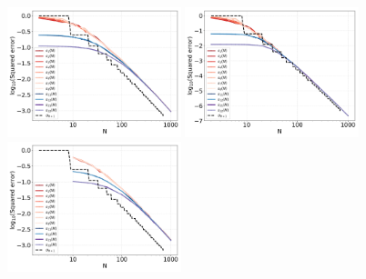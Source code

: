 \documentclass[twoside,11pt]{book}
\numberwithin{theorem}{chapter}
\numberwithin{definition}{chapter}
\numberwithin{proposition}{chapter}
\numberwithin{corollary}{chapter}
\numberwithin{example}{chapter}
\numberwithin{lemma}{chapter}
\numberwithin{assumption}{chapter}
\begin{document}
\begin{figure}
\centering
\includegraphics[width=0.45\textwidth]{img/neurips/multiSobolev/multig_interpolation_Korobov_s_1_fig_1.pdf}
\includegraphics[width=0.45\textwidth]{img/neurips/multiSobolev/multig_interpolation_Korobov_s_2_fig_1.pdf}\\
\includegraphics[width=0.45\textwidth]{img/neurips/multiSobolev/LVSQ_multig_interpolation_Korobov_s_1_fig_1.pdf}

\end{figure}
\end{document}

